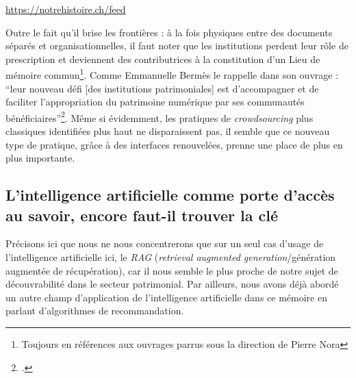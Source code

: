 \begin{center}
	\url{https://notrehistoire.ch/feed}
\end{center}

Outre le fait qu’il brise les frontières : à la fois physiques entre des documents séparés et organisationnelles, il faut noter que les institutions perdent leur rôle de prescription et deviennent des contributrices à la constitution d’un Lieu de mémoire commun\footnote{Toujours en références aux ouvrages parrus sous la direction de Pierre Nora}. Comme Emmanuelle Bermès le rappelle dans son ouvrage : \enquote{leur nouveau défi [des institutions patrimoniales] est d’accompagner et de faciliter l’appropriation du patrimoine numérique par ses communautés bénéficiaires}\footcite[p. 186]{bermes2024}. Même si évidemment, les pratiques de \textit{crowdsourcing} plus classiques identifiées plus haut ne disparaissent pas, il semble que ce nouveau type de pratique, grâce à des interfaces renouvelées, prenne une place de plus en plus importante.


\subsection{L'intelligence artificielle comme porte d'accès au savoir, encore faut-il trouver la clé}

Précisons ici que nous ne nous concentrerons que sur un seul cas d’usage de l’intelligence artificielle ici, le \textit{RAG} (\textit{retrieval augmented generation}/génération augmentée de récupération), car il nous semble le plus proche de notre sujet de découvrabilité dans le secteur patrimonial. Par ailleurs, nous avons déjà abordé un autre champ d’application de l’intelligence artificielle dans ce mémoire en parlant d’algorithmes de recommandation.

